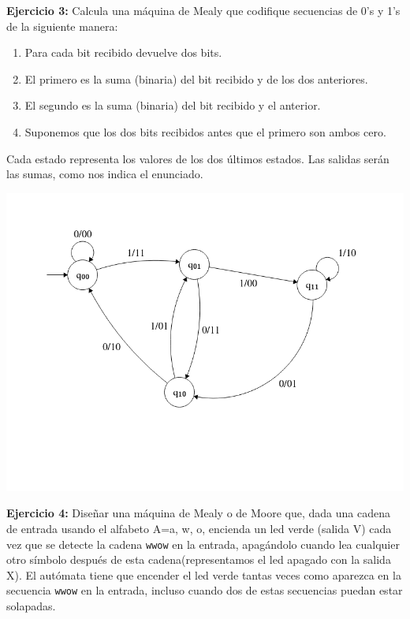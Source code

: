 \documentclass[12pt, spanish]{article}
\begin{document}
\newpage

\textbf{Ejercicio 3:} Calcula una máquina de Mealy que codifique secuencias de 0’s y 1’s de la siguiente manera:

\begin{enumerate}
	\item Para cada bit recibido devuelve dos bits.
	\item El primero es la suma (binaria) del bit recibido y de los dos anteriores.
	\item El segundo es la suma (binaria) del bit recibido y el anterior.
	\item Suponemos que los dos bits recibidos antes que el primero son ambos cero.

\end{enumerate}

Cada estado representa los valores de los dos últimos estados. Las salidas serán las sumas, como nos indica el enunciado.

\begin{center}
	\includegraphics[scale=0.5]{aut3.png}
\end{center}

\newpage

\textbf{Ejercicio 4:} Diseñar una máquina de Mealy o de Moore que, dada una cadena de entrada usando el alfabeto A={a, w, o}, encienda un led verde (salida V) cada vez que se detecte la cadena \texttt{wwow} en la entrada, apagándolo cuando lea cualquier otro símbolo después de esta cadena(representamos el led apagado con la salida X). El autómata tiene que encender el led verde tantas veces como aparezca en la secuencia \texttt{wwow} en la entrada, incluso cuando dos de estas secuencias puedan estar solapadas.
\end{document}
